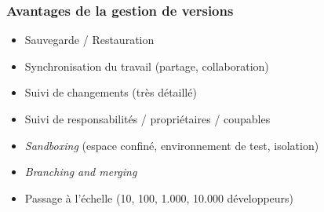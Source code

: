 \documentclass[table,tikz,12pt,svgnames]{beamer}
\begin{document}
\begin{frame}
	\frametitle{Avantages de la gestion de versions}
	\begin{block}{}
    \begin{adjustwidth}{-0.9cm}{}
		\begin{itemize}
			\item Sauvegarde / Restauration
			\item Synchronisation du travail (partage, collaboration)
			\item Suivi de changements (très détaillé)
			\item Suivi de responsabilités / propriétaires / coupables
			\item \textit{Sandboxing} (espace confiné, environnement de test, isolation)
			\item \textit{Branching and merging}
			\item Passage à l'échelle (10, 100, 1.000, 10.000 développeurs)
		\end{itemize}
	\end{adjustwidth}
	\end{block}
	\begin{block}{}
    \begin{adjustwidth}{-0.9cm}{}
		\begin{itemize}
		\end{itemize}
	\end{adjustwidth}
	\end{block}
\end{frame}
\end{document}
